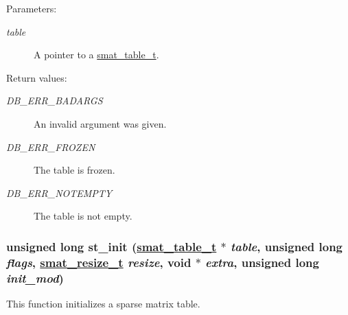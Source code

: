 \begin{Desc}
\item[Parameters:]
\begin{description}
\item[{\em table}]A pointer to a \hyperlink{group__dbprim__smat_a0}{smat\_\-table\_\-t}.\end{description}
\end{Desc}
\begin{Desc}
\item[Return values:]
\begin{description}
\item[{\em DB\_\-ERR\_\-BADARGS}]An invalid argument was given. \item[{\em DB\_\-ERR\_\-FROZEN}]The table is frozen. \item[{\em DB\_\-ERR\_\-NOTEMPTY}]The table is not empty. \end{description}
\end{Desc}
\hypertarget{group__dbprim__smat_a9}{
\subsubsection[st\_\-init]{\setlength{\rightskip}{0pt plus 5cm}unsigned long st\_\-init (\hyperlink{dbprim_8h_a0}{smat\_\-table\_\-t} $\ast$ {\em table}, unsigned long {\em flags}, \hyperlink{dbprim_8h_a3}{smat\_\-resize\_\-t} {\em resize}, void $\ast$ {\em extra}, unsigned long {\em init\_\-mod})}}
\label{group__dbprim__smat_a9}


This function initializes a sparse matrix table.

